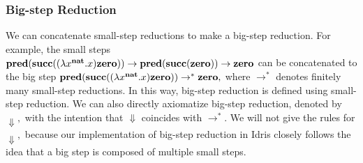 \subsubsection{Big-step Reduction}

We can concatenate small-step reductions to make a big-step reduction. For example, the small steps $\textbf{pred}(\textbf{succ}((\lambda x^{\textbf{nat}}.x)\textbf{zero})) \to \textbf{pred}(\textbf{succ}(\textbf{zero})) \to \textbf{zero}$ can be concatenated to the big step $\textbf{pred}(\textbf{succ}((\lambda x^{\textbf{nat}}.x)\textbf{zero})) \to^* \textbf{zero},$ where $\to^*$ denotes finitely many small-step reductions. In this way, big-step reduction is defined using small-step reduction. We can also directly axiomatize big-step reduction, denoted by $\Downarrow,$ with the intention that $\Downarrow$ coincides with $\to^*.$ We will not give the rules for $\Downarrow,$ because our implementation of big-step reduction in Idris closely follows the idea that a big step is composed of multiple small steps.


